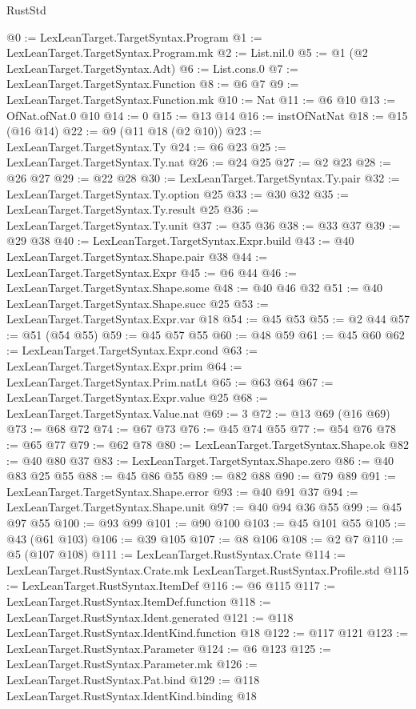 \begin{lexlean}{RustStd}
\begin{coremodule}
@0 := LexLeanTarget.TargetSyntax.Program
@1 := LexLeanTarget.TargetSyntax.Program.mk
@2 := List.nil.{0}
@5 := @1 (@2 LexLeanTarget.TargetSyntax.Adt)
@6 := List.cons.{0}
@7 := LexLeanTarget.TargetSyntax.Function
@8 := @6 @7
@9 := LexLeanTarget.TargetSyntax.Function.mk
@10 := Nat
@11 := @6 @10
@13 := OfNat.ofNat.{0} @10
@14 := 0
@15 := @13 @14
@16 := instOfNatNat
@18 := @15 (@16 @14)
@22 := @9 (@11 @18 (@2 @10))
@23 := LexLeanTarget.TargetSyntax.Ty
@24 := @6 @23
@25 := LexLeanTarget.TargetSyntax.Ty.nat
@26 := @24 @25
@27 := @2 @23
@28 := @26 @27
@29 := @22 @28
@30 := LexLeanTarget.TargetSyntax.Ty.pair
@32 := LexLeanTarget.TargetSyntax.Ty.option @25
@33 := @30 @32
@35 := LexLeanTarget.TargetSyntax.Ty.result @25
@36 := LexLeanTarget.TargetSyntax.Ty.unit
@37 := @35 @36
@38 := @33 @37
@39 := @29 @38
@40 := LexLeanTarget.TargetSyntax.Expr.build
@43 := @40 LexLeanTarget.TargetSyntax.Shape.pair @38
@44 := LexLeanTarget.TargetSyntax.Expr
@45 := @6 @44
@46 := LexLeanTarget.TargetSyntax.Shape.some
@48 := @40 @46 @32
@51 := @40 LexLeanTarget.TargetSyntax.Shape.succ @25
@53 := LexLeanTarget.TargetSyntax.Expr.var @18
@54 := @45 @53
@55 := @2 @44
@57 := @51 (@54 @55)
@59 := @45 @57 @55
@60 := @48 @59
@61 := @45 @60
@62 := LexLeanTarget.TargetSyntax.Expr.cond
@63 := LexLeanTarget.TargetSyntax.Expr.prim
@64 := LexLeanTarget.TargetSyntax.Prim.natLt
@65 := @63 @64
@67 := LexLeanTarget.TargetSyntax.Expr.value @25
@68 := LexLeanTarget.TargetSyntax.Value.nat
@69 := 3
@72 := @13 @69 (@16 @69)
@73 := @68 @72
@74 := @67 @73
@76 := @45 @74 @55
@77 := @54 @76
@78 := @65 @77
@79 := @62 @78
@80 := LexLeanTarget.TargetSyntax.Shape.ok
@82 := @40 @80 @37
@83 := LexLeanTarget.TargetSyntax.Shape.zero
@86 := @40 @83 @25 @55
@88 := @45 @86 @55
@89 := @82 @88
@90 := @79 @89
@91 := LexLeanTarget.TargetSyntax.Shape.error
@93 := @40 @91 @37
@94 := LexLeanTarget.TargetSyntax.Shape.unit
@97 := @40 @94 @36 @55
@99 := @45 @97 @55
@100 := @93 @99
@101 := @90 @100
@103 := @45 @101 @55
@105 := @43 (@61 @103)
@106 := @39 @105
@107 := @8 @106
@108 := @2 @7
@110 := @5 (@107 @108)
@111 := LexLeanTarget.RustSyntax.Crate
@114 := LexLeanTarget.RustSyntax.Crate.mk LexLeanTarget.RustSyntax.Profile.std
@115 := LexLeanTarget.RustSyntax.ItemDef
@116 := @6 @115
@117 := LexLeanTarget.RustSyntax.ItemDef.function
@118 := LexLeanTarget.RustSyntax.Ident.generated
@121 := @118 LexLeanTarget.RustSyntax.IdentKind.function @18
@122 := @117 @121
@123 := LexLeanTarget.RustSyntax.Parameter
@124 := @6 @123
@125 := LexLeanTarget.RustSyntax.Parameter.mk
@126 := LexLeanTarget.RustSyntax.Pat.bind
@129 := @118 LexLeanTarget.RustSyntax.IdentKind.binding @18

\end{coremodule}
\end{lexlean}
